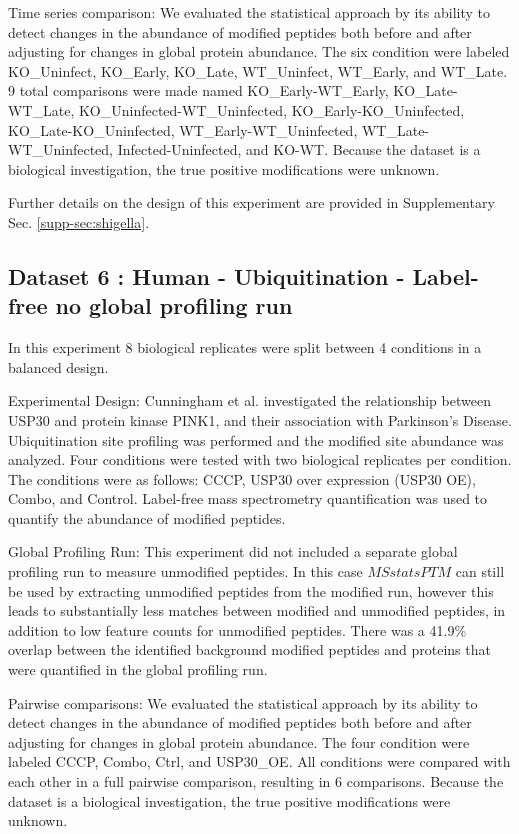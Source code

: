 \documentclass[mcp]{article}
\numberwithin{table}{section}
\begin{document}
Time series comparison: We evaluated the statistical approach by its ability to detect changes in the abundance of modified peptides both before and after adjusting for changes in global protein abundance. The six condition were labeled KO\_Uninfect, KO\_Early, KO\_Late, WT\_Uninfect, WT\_Early, and WT\_Late. 9 total comparisons were made named KO\_Early-WT\_Early, KO\_Late-WT\_Late, KO\_Uninfected-WT\_Uninfected, KO\_Early-KO\_Uninfected, KO\_Late-KO\_Uninfected, WT\_Early-WT\_Uninfected, WT\_Late-WT\_Uninfected, Infected-Uninfected, and KO-WT. Because the dataset is a biological investigation, the true positive modifications were unknown.

Further details on the design of this experiment are provided in Supplementary Sec. \ref{supp-sec:shigella}.

\subsection*{Dataset 6 : Human - Ubiquitination - Label-free no global profiling run}
\label{sec:exp_proc_dataset6}

In this experiment 8 biological replicates were split between 4 conditions in a balanced design.

Experimental Design: Cunningham et al. \cite{Cunningham2015} investigated the relationship between USP30 and protein kinase PINK1, and their association with Parkinson’s Disease. Ubiquitination site profiling was performed and the modified site abundance was analyzed. Four conditions were tested with two biological replicates per condition. The conditions were as follows: CCCP, USP30 over expression (USP30 OE), Combo, and Control. Label-free mass spectrometry quantification was used to quantify the abundance of modified peptides.

Global Profiling Run: This experiment did not included a separate global profiling run to measure unmodified peptides. In this case $MSstatsPTM$ can still be used by extracting unmodified peptides from the modified run, however this leads to substantially less matches between modified and unmodified peptides, in addition to low feature counts for unmodified peptides. There was a 41.9\% overlap between the identified background modified peptides and proteins that were quantified in the global profiling run.

Pairwise comparisons: We evaluated the statistical approach by its ability to detect changes in the abundance of modified peptides both before and after adjusting for changes in global protein abundance. The four condition were labeled CCCP, Combo, Ctrl, and USP30\_OE. All conditions were compared with each other in a full pairwise comparison, resulting in 6 comparisons. Because the dataset is a biological investigation, the true positive modifications were unknown.
\end{document}
